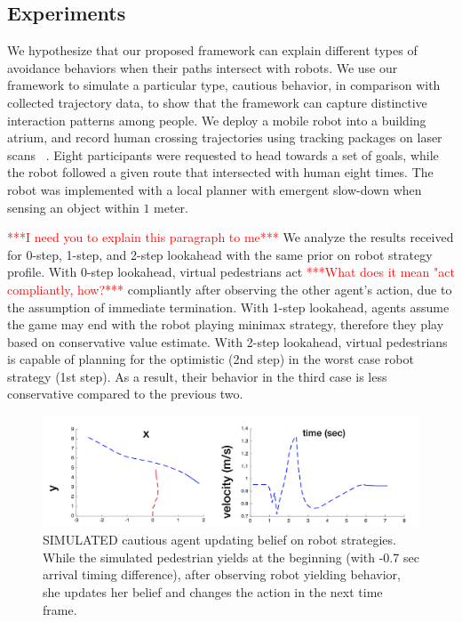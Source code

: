\documentclass[letterpaper, 10 pt, conference]{ieeeconf}  %
\begin{document}
\subsection{Experiments}
We hypothesize that our proposed framework can explain different types of avoidance behaviors when their paths intersect with robots. We use our framework to simulate a particular type, cautious behavior, in comparison with collected trajectory data, to show that the framework can capture distinctive interaction patterns among people. We deploy a mobile robot into a building atrium, and record human crossing trajectories using tracking packages on laser scans ~\cite{leigh2015person}. Eight participants were requested to head towards a set of goals, while the robot followed a given route that intersected with human eight times. The robot was implemented with a local planner with emergent slow-down when sensing an object within $1$ meter. 

\textcolor{red}{***I need you to explain this paragraph to me***} We analyze the results received for 0-step, 1-step, and 2-step lookahead with the same prior on robot strategy profile. With 0-step lookahead, virtual pedestrians act \textcolor{red}{***What does it mean "act compliantly, how?***} compliantly after observing the other agent's action, due to the assumption of immediate termination. With 1-step lookahead, agents assume the game may end with the robot playing minimax strategy, therefore they play based on conservative value estimate. With 2-step lookahead, virtual pedestrians is capable of planning for the optimistic (2nd step) in the worst case robot strategy (1st step). As a result, their behavior in the third case is less conservative compared to the previous two. 

\begin{figure}[t]
      \centering
      \hspace{-5em}
      \vspace{-1.3em}
      \includegraphics[scale=0.33]{adaptation}
      \hspace{-5em}
      \caption{SIMULATED cautious agent updating belief on robot strategies. While the simulated pedestrian yields at the 
      beginning (with -0.7 sec arrival timing difference), after observing 
      robot yielding behavior, she updates her 
      belief and changes the action in the next time frame.}
      \vspace{-2em}
     \label{fig:adaptation}
\end{figure}
\end{document}
